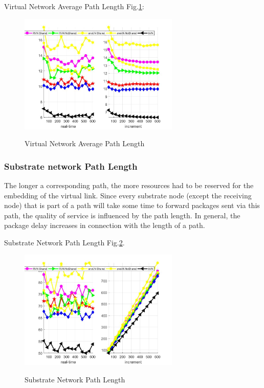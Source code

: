Virtual Network Average Path Length Fig.\ref{fig:PathLengthAverageVirtualNetwork}:
\begin{figure}
  \centering
  \includegraphics[width=3in]{Fig/PathLengthAverageVirtualNetwork}\\
  \caption{Virtual Network Average Path Length }\label{fig:PathLengthAverageVirtualNetwork}
\end{figure}

\subsubsection{Substrate network Path Length}
The longer a corresponding path, the more resources had to be reserved for the embedding of the virtual link. Since every substrate node (except the receiving node) that is part of a path will take some time to forward packages sent via this path, the quality of service is influenced by the path length. In general, the package delay increases in connection with the length of a path.

Substrate Network Path Length Fig.\ref{fig:PathLengthSubstrateNetwork}.
\begin{figure}
  \centering
  \includegraphics[width=3in]{Fig/PathLengthSubstrateNetwork}\\
  \caption{ Substrate Network Path Length}\label{fig:PathLengthSubstrateNetwork}
\end{figure}

